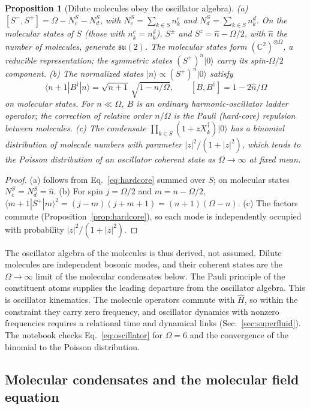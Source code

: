 \documentclass[reprint,aps,prd,amsmath,amssymb,superscriptaddress,nofootinbib,floatfix]{revtex4-2}
\theoremstyle{plain}
\newtheorem{proposition}{Proposition}
\theoremstyle{definition}
\theoremstyle{remark}
\newcommand{\Mol}{\ensuremath{X}}                 %
\newcommand{\ket}[1]{\ensuremath{|#1\rangle}}
\newcommand{\Hc}{\hat{H}}
\begin{document}
\begin{proposition}[Dilute molecules obey the oscillator algebra]
\label{prop:oscillator}
(a) $[S^-,S^+]=\Omega-N^S_c-N^S_d$, with $N^S_c=\sum_{k\in S}n^c_k$ and $N^S_d=\sum_{k\in S}n^d_k$. On the molecular states of $S$
(those with $n^c_k=n^d_k$), $S^\pm$ and $S^z=\hat n-\Omega/2$, with $\hat n$ the number of molecules, generate $\mathfrak{su}(2)$. The
molecular states form $(\mathbb C^2)^{\otimes\Omega}$, a reducible representation; the symmetric states $(S^+)^n\ket0$ carry its
spin-$\Omega/2$ component.
(b) The normalized states $\ket n\propto(S^+)^n\ket0$ satisfy
\begin{equation}
\langle n+1|B^\dagger|n\rangle=\sqrt{n+1}\,\sqrt{1-n/\Omega},\qquad [B,B^\dagger]=1-2\hat n/\Omega
\label{eq:oscillator}
\end{equation}
on molecular states. For $n\ll\Omega$, $B$ is an ordinary harmonic-oscillator ladder operator; the correction of relative
order $n/\Omega$ is the Pauli (hard-core) repulsion between molecules.
(c) The condensate $\prod_{k\in S}(1+z\Mol^\dagger_k)\ket0$ has a binomial distribution of molecule numbers with parameter
$|z|^2/(1+|z|^2)$, which tends to the Poisson distribution of an oscillator coherent state as $\Omega\to\infty$ at fixed mean.
\end{proposition}
\begin{proof}
(a) follows from Eq.~\eqref{eq:hardcore} summed over $S$; on molecular states $N^S_c=N^S_d=\hat n$. (b) For spin $j=\Omega/2$ and
$m=n-\Omega/2$, $\langle m+1|S^+|m\rangle^2=(j-m)(j+m+1)=(n+1)(\Omega-n)$. (c) The factors commute
(Proposition~\ref{prop:hardcore}), so each mode is independently occupied with probability $|z|^2/(1+|z|^2)$.
\end{proof}
The oscillator algebra of the molecules is thus derived, not assumed. Dilute molecules are independent bosonic modes,
and their coherent states are the $\Omega\to\infty$ limit of the molecular condensates below. The Pauli principle of the
constituent atoms supplies the leading departure from the oscillator algebra. This is oscillator kinematics. The
molecule operators commute with $\Hc$, so within the constraint they carry zero frequency, and oscillator dynamics with
nonzero frequencies requires a relational time and dynamical links (Sec.~\ref{sec:superfluid}). The notebook checks
Eq.~\eqref{eq:oscillator} for $\Omega=6$ and the convergence of the binomial to the Poisson distribution.

\subsection{Molecular condensates and the molecular field equation}
\label{sec:coherent}
\end{document}
